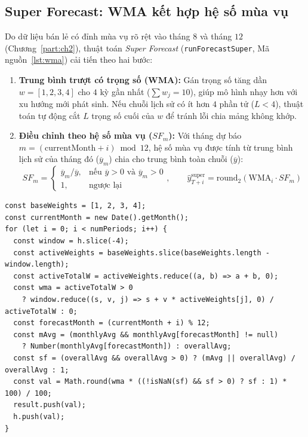\subsection{Super Forecast: WMA kết hợp hệ số mùa vụ}
\label{sec:ch4-wma}
Do dữ liệu bán lẻ có đỉnh mùa vụ rõ rệt vào tháng $8$ và tháng $12$ (Chương~\ref{part:ch2}), thuật toán \textit{Super Forecast} (\texttt{runForecastSuper}, Mã nguồn~\ref{lst:wma}) cải tiến theo hai bước:
\begin{enumerate}[label=\textit{\arabic*},topsep=0pt, itemsep=1pt]
	\item \textbf{Trung bình trượt có trọng số (WMA):} Gán trọng số tăng dần $w = [1, 2, 3, 4]$ cho $4$ kỳ gần nhất ($\sum w_j = 10$), giúp mô hình nhạy hơn với xu hướng mới phát sinh. Nếu chuỗi lịch sử có ít hơn $4$ phần tử ($L < 4$), thuật toán tự động cắt $L$ trọng số cuối của $w$ để tránh lỗi chia mảng không khớp.
	\item \textbf{Điều chỉnh theo hệ số mùa vụ ($SF_m$):} Với tháng dự báo $m = (\text{currentMonth} + i) \bmod 12$, hệ số mùa vụ được tính từ trung bình lịch sử của tháng đó ($\overline{y}_m$) chia cho trung bình toàn chuỗi ($\overline{y}$):
	      \begin{equation}
		      SF_m = \begin{cases}
			      \overline{y}_m / \overline{y}, & \text{nếu } \overline{y} > 0 \text{ và } \overline{y}_m > 0 \\
			      1,                             & \text{ngược lại}
		      \end{cases}, \qquad
		      \hat{y}^{\text{super}}_{T+i} = \text{round}_2(\text{WMA}_i \cdot SF_m)
	      \end{equation}
\end{enumerate}

\begin{listing}[H]
	\begin{verbatim}
const baseWeights = [1, 2, 3, 4];
const currentMonth = new Date().getMonth();
for (let i = 0; i < numPeriods; i++) {
  const window = h.slice(-4);
  const activeWeights = baseWeights.slice(baseWeights.length - window.length);
  const activeTotalW = activeWeights.reduce((a, b) => a + b, 0);
  const wma = activeTotalW > 0
    ? window.reduce((s, v, j) => s + v * activeWeights[j], 0) / activeTotalW : 0;
  const forecastMonth = (currentMonth + i) % 12;
  const mAvg = (monthlyAvg && monthlyAvg[forecastMonth] != null)
    ? Number(monthlyAvg[forecastMonth]) : overallAvg;
  const sf = (overallAvg && overallAvg > 0) ? (mAvg || overallAvg) / overallAvg : 1;
  const val = Math.round(wma * ((!isNaN(sf) && sf > 0) ? sf : 1) * 100) / 100;
  result.push(val);
  h.push(val);
}
\end{verbatim}
	\caption{Trích đoạn thuật toán Super Forecast (WMA + Mùa vụ) trong \texttt{forecastsuper.js}}
	\label{lst:wma}
\end{listing}

